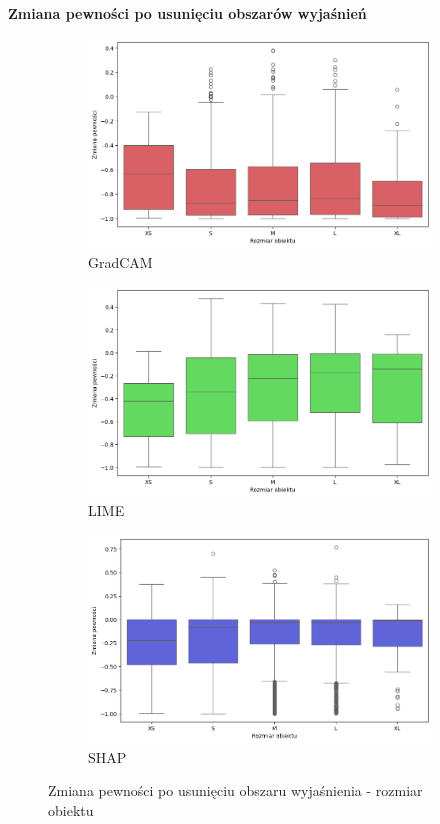 \textbf{Zmiana pewności po usunięciu obszarów wyjaśnień}
\begin{figure}[h]
	\centering
	\begin{subfigure}[b]{0.3\textwidth}
		\centering\includegraphics[width=.9\textwidth]{img/size_confidence_no_exp_gradcam}
		\caption{GradCAM}  \label{rys:size_confidence_no_exp_gradcam}
	\end{subfigure}
	\begin{subfigure}[b]{0.3\textwidth}
		\centering\includegraphics[width=.9\textwidth]{img/size_confidence_no_exp_lime}
		\caption{LIME}  \label{rys:size_confidence_no_exp_lime}
	\end{subfigure}
	\begin{subfigure}[b]{0.3\textwidth}
		\centering\includegraphics[width=.9\textwidth]{img/size_confidence_no_exp_shap}
		\caption{SHAP}  \label{rys:size_confidence_no_exp_shap}
	\end{subfigure}
	\caption{Zmiana pewności po usunięciu obszaru wyjaśnienia - rozmiar obiektu}
\end{figure}


